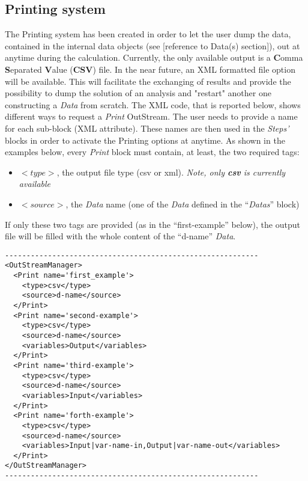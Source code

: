 \subsection{Printing system \label{sec:printing}}
The Printing system has been created in order to let the user dump  the data, contained in the internal data objects (see [reference to Data(s) section]), out at anytime during the calculation. Currently, the only available output is a \textbf{C}omma \textbf{S}eparated \textbf{V}alue (\textbf{CSV}) file. In the near future, an XML formatted file option will be available. This will facilitate  the exchanging of results and provide the possibility to dump the solution of an analysis and "restart" another one constructing a \textit{Data} from scratch.
The XML code, that is reported below, shows different ways to request a \textit{Print} OutStream. The user needs to provide a name for each sub-block (XML attribute). These names are then used in the \textit{Steps'} blocks in order to activate the Printing options at anytime.
As shown in the examples below, every \textit{Print} block must contain, at least, the two required tags:
\vspace{-5mm}
\begin{itemize}
\itemsep0em
\item $<type>$, the output file type (csv or xml). \textit{Note, only \textbf{csv} is currently available}
\item $<source>$, the \textit{Data} name (one of the \textit{Data} defined in the ``\textit{Datas}'' block)
\end{itemize}
\vspace{-5mm}
If only these two tags are provided (as in the ``first-example'' below), the output file will be filled with the whole content of the ``d-name'' \textit{Data}. 
\begin{lstlisting}[style=XML]
-----------------------------------------------------------
<OutStreamManager>
  <Print name='first_example'>
    <type>csv</type>
    <source>d-name</source>
  </Print>
  <Print name='second-example'>
    <type>csv</type>
    <source>d-name</source>
    <variables>Output</variables>
  </Print>
  <Print name='third-example'>
    <type>csv</type>
    <source>d-name</source>
    <variables>Input</variables>
  </Print>
  <Print name='forth-example'>
    <type>csv</type>
    <source>d-name</source>
    <variables>Input|var-name-in,Output|var-name-out</variables>
  </Print>
</OutStreamManager>
-----------------------------------------------------------
\end{lstlisting}
